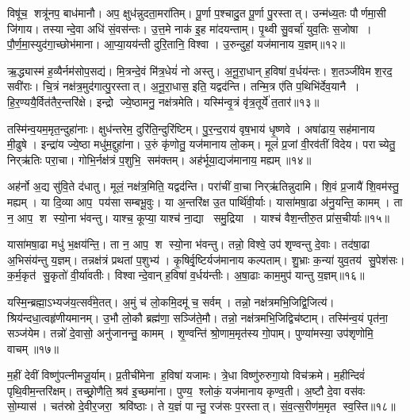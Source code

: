 विषू॑च॒ शत्रू॑नप॒ बाध॑मानौ।
अप॒ क्षुध॑न्नुदता॒मरा॑तिम्।
पू॒र्णा प॒श्चादु॒त पू॒र्णा पु॒रस्तात्।
उन्म॑ध्य॒तः पौर्णमा॒सी जि॑गाय।
तस्यान्दे॒वा अधि॑ सं॒वस॑न्तः।
उ॒त्त॒मे नाक॑ इ॒ह मा॑दयन्ताम्।
पृ॒थ्वी सु॒वर्चा॑ युव॒तिः स॒जोषा।
पौ॒र्ण॒मा॒स्युद॑गा॒च्छोभ॑माना।
आ॒प्या॒यय॑न्ती दुरि॒तानि॒ विश्वा।
उ॒रुन्दुहां॒ यज॑मानाय य॒ज्ञम्॥१२॥\anuvakamend[चि॒त्रभा॑नु॒र्यज॑माने दधातु ह॒विर्न॒ पाथ॒श्चेतो॑ जुषन्ता॒ञ्चेतो॑ मदेम॒ रोच॑माना॒मरा॑तीर्गो॒पौ य॒ज्ञम्]

ऋ॒द्ध्यास्म॑ ह॒व्यैर्नम॑सोप॒सद्य॑।
मि॒त्रन्दे॒वं मि॑त्र॒धेयं॑ नो अस्तु।
अ॒नू॒रा॒धान् ह॒विषा॑ व॒र्धय॑न्तः।
श॒तञ्जी॑वेम श॒रद॒ सवी॑राः।
चि॒त्रं नक्ष॑त्र॒मुद॑गात्पु॒रस्तात्।
अ॒नू॒रा॒धास॒ इति॒ यद्वद॑न्ति।
तन्मि॒त्र ए॑ति प॒थिभि॑र्देव॒यानै।
हि॒र॒ण्ययै॒र्वित॑तैर॒न्तरि॑क्षे।
इन्द्रो ज्ये॒ष्ठामनु॒ नक्ष॑त्रमेति।
यस्मि॑न्वृ॒त्रं वृ॑त्र॒तूर्ये॑ त॒तार॑॥१३॥

तस्मि॑न्व॒यम॒मृत॒न्दुहा॑नाः।
क्षुध॑न्तरेम॒ दुरि॑ति॒न्दुरि॑ष्टिम्।
पु॒र॒न्द॒राय॑ वृष॒भाय॑ धृ॒ष्णवे।
अषा॑ढाय॒ सह॑मानाय मी॒ढुषे।
इन्द्रा॑य ज्ये॒ष्ठा मधु॑म॒द्दुहा॑ना।
उ॒रुं कृ॑णोतु॒ यज॑मानाय लो॒कम्।
मूलं॑ प्र॒जां वी॒रव॑तीं विदेय।
पराच्येतु॒ निर्‌ऋ॑तिः परा॒चा।
गोभि॒र्नक्ष॑त्रं प॒शुभि॒ सम॑क्तम्।
अह॑र्भूया॒द्यज॑मानाय॒ मह्यम्॥१४॥

अह॑र्नो अ॒द्य सु॑वि॒ते द॑धातु।
मूलं॒ नक्ष॑त्र॒मिति॒ यद्वद॑न्ति।
परा॑चीं वा॒चा निर्‌ऋ॑तिन्नुदामि।
शि॒वं प्र॒जायै॑ शि॒वम॑स्तु॒ मह्यम्।
या दि॒व्या आप॒ पय॑सा सम्बभू॒वुः।
या अ॒न्तरि॑क्ष उ॒त पार्थि॑वी॒र्याः।
यासा॑मषा॒ढा अ॑नु॒यन्ति॒ कामम्।
ता न॒ आप॒ श स्यो॒ना भ॑वन्तु।
याश्च॒ कूप्या॒ याश्च॑ ना॒द्या समु॒द्रिया।
याश्च॑ वैश॒न्तीरु॒त प्रा॑स॒चीर्याः॥१५॥

यासा॑मषा॒ढा मधु॑ भ॒क्षय॑न्ति॒।
ता न॒ आप॒ श स्यो॒ना भ॑वन्तु।
तन्नो॒ विश्वे॒ उप॑ शृण्वन्तु दे॒वाः।
तद॑षा॒ढा अ॒भिसंय॑न्तु य॒ज्ञम्।
तन्नक्ष॑त्रं प्रथतां प॒शुभ्य॑।
कृ॒षिर्वृ॒ष्टिर्यज॑मानाय कल्पताम्।
शु॒भ्राः क॒न्या॑ युव॒तय॑ सु॒पेश॑सः।
क॒र्म॒कृत॑ सु॒कृतो॑ वी॒र्या॑वतीः।
विश्वान्दे॒वान् ह॒विषा॑ व॒र्धय॑न्तीः।
अ॒षा॒ढाः काम॒मुप॑ यान्तु य॒ज्ञम्॥१६॥

यस्मि॒न्ब्रह्मा॒ऽभ्यज॑य॒त्सर्व॑मे॒तत्।
अ॒मुं च॑ लो॒कमि॒दमू॑ च॒ सर्वम्।
तन्नो॒ नक्ष॑त्रमभि॒जिद्वि॒जित्य॑।
श्रिय॑न्दधा॒त्वहृ॑णीयमानम्।
उ॒भौ लो॒कौ ब्रह्म॑णा॒ सञ्जि॑ते॒मौ।
तन्नो॒ नक्ष॑त्रमभि॒जिद्विच॑ष्टाम्।
तस्मि॑न्व॒यं पृत॑ना॒ सञ्ज॑येम।
तन्नो॑ दे॒वासो॒ अनु॑जानन्तु॒ कामम्।
शृ॒ण्वन्ति॑ श्रो॒णाम॒मृत॑स्य गो॒पाम्।
पुण्या॑मस्या॒ उप॑शृणोमि॒ वाचम्॥१७॥

म॒हीं देवीं विष्णु॑पत्नीमजू॒र्याम्।
प्र॒तीची॑मेना ह॒विषा॑ यजामः।
त्रे॒धा विष्णु॑रुरुगा॒यो विच॑क्रमे।
म॒हीन्दिवं॑ पृथि॒वीम॒न्तरि॑क्षम्।
तच्छ्रो॒णैति॒ श्रव॑ इ॒च्छमा॑ना।
पुण्य॒ श्लोकं॒ यज॑मानाय कृण्व॒ती।
अ॒ष्टौ दे॒वा वस॑वः सो॒म्यास॑।
चत॑स्रो दे॒वीर॒जरा॒ श्रवि॑ष्ठाः।
ते य॒ज्ञं पान्तु॒ रज॑सः प॒रस्तात्।
सं॒व॒त्स॒रीण॑म॒मृत स्व॒स्ति॥१८॥

